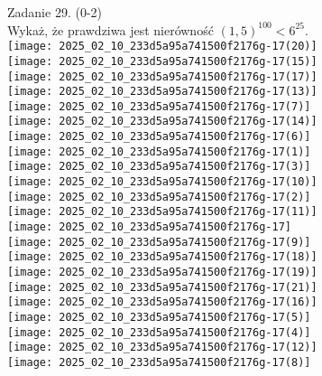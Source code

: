 \documentclass[10pt]{article}
\begin{document}
Zadanie 29. (0-2)\\
Wykaż, że prawdziwa jest nierówność \((1,5)^{100}<6^{25}\).\\
\(\qquad\)\\
\texttt{[image: 2025\_02\_10\_233d5a95a741500f2176g-17(20)]}\\
\texttt{[image: 2025\_02\_10\_233d5a95a741500f2176g-17(15)]}\\
\texttt{[image: 2025\_02\_10\_233d5a95a741500f2176g-17(17)]}\\
\texttt{[image: 2025\_02\_10\_233d5a95a741500f2176g-17(13)]}\\
\texttt{[image: 2025\_02\_10\_233d5a95a741500f2176g-17(7)]}\\
\texttt{[image: 2025\_02\_10\_233d5a95a741500f2176g-17(14)]}\\
\texttt{[image: 2025\_02\_10\_233d5a95a741500f2176g-17(6)]}\\
\texttt{[image: 2025\_02\_10\_233d5a95a741500f2176g-17(1)]}\\
\texttt{[image: 2025\_02\_10\_233d5a95a741500f2176g-17(3)]}\\
\texttt{[image: 2025\_02\_10\_233d5a95a741500f2176g-17(10)]}\\
\(\qquad\)\\
\texttt{[image: 2025\_02\_10\_233d5a95a741500f2176g-17(2)]}\\
\texttt{[image: 2025\_02\_10\_233d5a95a741500f2176g-17(11)]}\\
\texttt{[image: 2025\_02\_10\_233d5a95a741500f2176g-17]}\\
\texttt{[image: 2025\_02\_10\_233d5a95a741500f2176g-17(9)]}\\
\texttt{[image: 2025\_02\_10\_233d5a95a741500f2176g-17(18)]}\\
\texttt{[image: 2025\_02\_10\_233d5a95a741500f2176g-17(19)]}\\
\texttt{[image: 2025\_02\_10\_233d5a95a741500f2176g-17(21)]}\\
\texttt{[image: 2025\_02\_10\_233d5a95a741500f2176g-17(16)]}\\
\texttt{[image: 2025\_02\_10\_233d5a95a741500f2176g-17(5)]}\\
\(\qquad\)\\
\texttt{[image: 2025\_02\_10\_233d5a95a741500f2176g-17(4)]}\\
\texttt{[image: 2025\_02\_10\_233d5a95a741500f2176g-17(12)]}\\
\texttt{[image: 2025\_02\_10\_233d5a95a741500f2176g-17(8)]}
\end{document}
